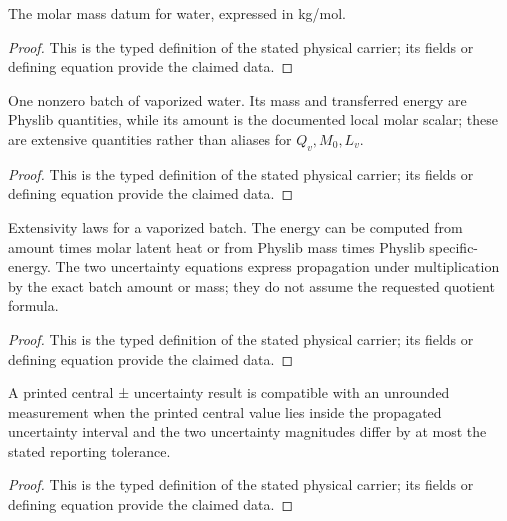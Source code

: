 \begin{definition}
  \label{def:physics:IPhO_2026_4_B_6:aux009}
  The molar mass datum for water, expressed in kg/mol.
\end{definition}
\begin{proof}
  This is the typed definition of the stated physical carrier; its fields or defining equation provide the claimed data.
\end{proof}

\begin{definition}
  \label{def:physics:IPhO_2026_4_B_6:aux010}
  One nonzero batch of vaporized water.  Its mass and transferred energy are
  Physlib quantities, while its amount is the documented local molar scalar;
  these are extensive quantities rather than aliases for \(Q_v,M_0,L_v\).
\end{definition}
\begin{proof}
  This is the typed definition of the stated physical carrier; its fields or defining equation provide the claimed data.
\end{proof}

\begin{definition}
  \label{def:physics:IPhO_2026_4_B_6:aux011}
  Extensivity laws for a vaporized batch.  The energy can be computed from
  amount times molar latent heat or from Physlib mass times Physlib
  specific-energy.  The two uncertainty equations express propagation under
  multiplication by the exact batch amount or mass; they do not assume the
  requested quotient formula.
\end{definition}
\begin{proof}
  This is the typed definition of the stated physical carrier; its fields or defining equation provide the claimed data.
\end{proof}

\begin{definition}
  \label{def:physics:IPhO_2026_4_B_6:aux012}
  A printed central ± uncertainty result is compatible with an unrounded measurement when the printed central value lies inside the propagated uncertainty interval and the two uncertainty magnitudes differ by at most the stated reporting tolerance.
\end{definition}
\begin{proof}
  This is the typed definition of the stated physical carrier; its fields or defining equation provide the claimed data.
\end{proof}

